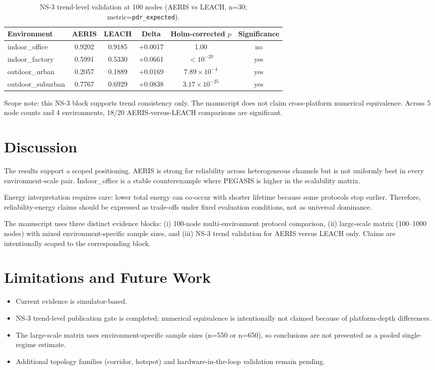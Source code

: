 \documentclass[sensors,article,submit,moreauthors,pdftex]{Definitions/mdpi}
\begin{document}
\begin{table}[H]
\caption{NS-3 trend-level validation at 100 nodes (AERIS vs LEACH, n=30; metric=\texttt{pdr\_expected}).}
\label{tab:ns3_trend}
\centering
\begin{tabular}{lccccc}
\toprule
Environment & AERIS & LEACH & Delta & Holm-corrected $p$ & Significance \\
\midrule
indoor\_office    & 0.9202 & 0.9185 & +0.0017 & 1.00 & no \\
indoor\_factory   & 0.5991 & 0.5330 & +0.0661 & $<10^{-20}$ & yes \\
outdoor\_urban    & 0.2057 & 0.1889 & +0.0169 & $7.89\times10^{-4}$ & yes \\
outdoor\_suburban & 0.7767 & 0.6929 & +0.0838 & $3.17\times10^{-25}$ & yes \\
\bottomrule
\end{tabular}
\end{table}

Scope note: this NS-3 block supports trend consistency only. The manuscript does not claim cross-platform numerical equivalence. Across 5 node counts and 4 environments, 18/20 AERIS-versus-LEACH comparisons are significant.

\section{Discussion}
The results support a scoped positioning. AERIS is strong for reliability across heterogeneous channels but is not uniformly best in every environment-scale pair. Indoor\_office is a stable counterexample where PEGASIS is higher in the scalability matrix.

Energy interpretation requires care: lower total energy can co-occur with shorter lifetime because some protocols stop earlier. Therefore, reliability-energy claims should be expressed as trade-offs under fixed evaluation conditions, not as universal dominance.

The manuscript uses three distinct evidence blocks: (i) 100-node multi-environment protocol comparison, (ii) large-scale matrix (100--1000 nodes) with mixed environment-specific sample sizes, and (iii) NS-3 trend validation for AERIS versus LEACH only. Claims are intentionally scoped to the corresponding block.

\section{Limitations and Future Work}
\begin{itemize}
\item Current evidence is simulator-based.
\item NS-3 trend-level publication gate is completed; numerical equivalence is intentionally not claimed because of platform-depth differences.
\item The large-scale matrix uses environment-specific sample sizes (n=550 or n=650), so conclusions are not presented as a pooled single-regime estimate.
\item Additional topology families (corridor, hotspot) and hardware-in-the-loop validation remain pending.
\end{itemize}
\end{document}
